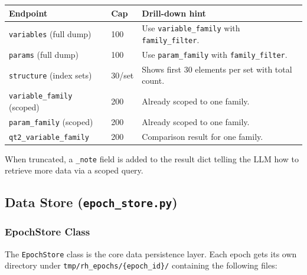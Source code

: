 \documentclass[11pt, a4paper]{article}
\begin{document}
\begin{longtable}{p{4.5cm} p{1.5cm} p{8cm}}
\toprule
\textbf{Endpoint} & \textbf{Cap} & \textbf{Drill-down hint} \\
\midrule
\texttt{variables} (full dump) & 100 &
    Use \texttt{variable\_family} with \texttt{family\_filter}. \\
\texttt{params} (full dump) & 100 &
    Use \texttt{param\_family} with \texttt{family\_filter}. \\
\texttt{structure} (index sets) & 30/set &
    Shows first 30 elements per set with total count. \\
\texttt{variable\_family} (scoped) & 200 &
    Already scoped to one family. \\
\texttt{param\_family} (scoped) & 200 &
    Already scoped to one family. \\
\texttt{qt2\_variable\_family} & 200 &
    Comparison result for one family. \\
\bottomrule
\end{longtable}

When truncated, a \texttt{\_note} field is added to the result dict
telling the LLM how to retrieve more data via a scoped query.


\subsection{Data Store (\texttt{epoch\_store.py})}

\subsubsection{EpochStore Class}

The \texttt{EpochStore} class is the core data persistence layer.  Each
epoch gets its own directory under \texttt{tmp/rh\_epochs/\{epoch\_id\}/}
containing the following files:
\end{document}
